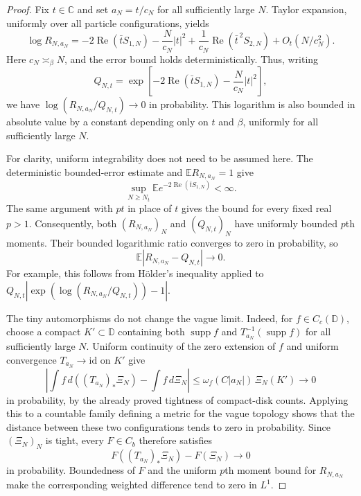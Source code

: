 \documentclass[11pt,a4paper]{article}
\numberwithin{equation}{section}
\theoremstyle{definition}
\theoremstyle{remark}
\begin{document}
\begin{proof}
Fix $t\in\mathbb C$ and set $a_N=t/c_N$ for all sufficiently large $N$.
Taylor expansion, uniformly over all particle configurations, yields
\begin{equation}\label{eq:mobius-small-tilt}
 \log R_{N,a_N}
 =-2\operatorname{Re}(\bar tS_{1,N})
   -\frac{N}{c_N}|t|^2
   +\frac1{c_N}\operatorname{Re}(\bar t^{\,2}S_{2,N})
   +O_t(N/c_N^2).
\end{equation}
Here $c_N\asymp_\beta N$, and the error bound holds deterministically.
Thus, writing
\[
 Q_{N,t}=\exp\left[-2\operatorname{Re}(\bar tS_{1,N})
                        -\frac{N}{c_N}|t|^2\right],
\]
we have $\log(R_{N,a_N}/Q_{N,t})\to0$ in probability. This logarithm
is also bounded in absolute value by a constant depending only on $t$
and $\beta$, uniformly for all sufficiently large $N$.

For clarity, uniform integrability does not need to be assumed here.
The deterministic bounded-error estimate and $\mathbb ER_{N,a_N}=1$
give
\[
 \sup_{N\ge N_t}
 \mathbb E e^{-2\operatorname{Re}(\bar tS_{1,N})}<\infty.
\]
The same argument with $pt$ in place of $t$ gives the bound for every
fixed real $p>1$. Consequently, both $(R_{N,a_N})_N$ and $(Q_{N,t})_N$
have uniformly bounded $p$th moments. Their bounded logarithmic ratio
converges to zero in probability, so
\begin{equation}\label{eq:tilt-l1}
 \mathbb E|R_{N,a_N}-Q_{N,t}|\longrightarrow0.
\end{equation}
For example, this follows from H\"older's inequality applied to
$Q_{N,t}|\exp(\log(R_{N,a_N}/Q_{N,t}))-1|$.

The tiny automorphisms do not change the vague limit. Indeed, for
$f\in C_c(\mathbb D)$, choose a compact $K'\subset\mathbb D$ containing
both $\operatorname{supp}f$ and $T_{a_N}^{-1}(\operatorname{supp}f)$ for
all sufficiently large $N$. Uniform continuity of the zero extension of
$f$ and uniform
convergence $T_{a_N}\to\mathrm{id}$ on $K'$ give
\[
 \left|\int f\,d((T_{a_N})_*\Xi_N)-\int f\,d\Xi_N\right|
 \le\omega_f(C|a_N|)\,\Xi_N(K')\longrightarrow0
\]
in probability, by the already proved tightness of compact-disk counts.
Applying this to a countable family defining a metric for the vague
topology shows that the distance between these two configurations tends
to zero in probability. Since $(\Xi_N)_N$ is tight, every $F\in C_b$
therefore satisfies
\[
 F((T_{a_N})_*\Xi_N)-F(\Xi_N)\longrightarrow0
\]
in probability. Boundedness of $F$ and the uniform $p$th moment bound
for $R_{N,a_N}$ make the corresponding weighted difference tend to zero
in $L^1$.


\end{proof}
\end{document}
